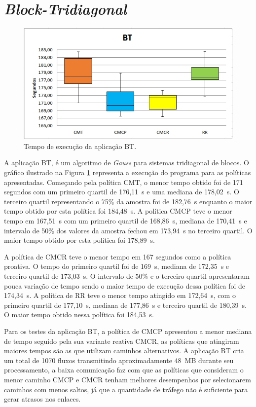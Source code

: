 \section{\textit{Block-Tridiagonal}}
\label{sec:bt}
\begin{figure}[!htb]
	\caption{\label{fig:bt}Tempo de execução da aplicação BT.}
	\begin{center}
	    \includegraphics[scale=0.60]{imagens/bt.jpg}
	\end{center}
\end{figure}
A aplicação BT, é um algoritmo de \textit{Gauss} para sistemas tridiagonal de blocos. 
O gráfico ilustrado na Figura \ref{fig:bt} representa a execução do programa para as políticas apresentadas. Começando pela política CMT, o menor tempo obtido foi de 171 segundos com um primeiro quartil de 176,11~s e uma mediana de 178,02~s. O terceiro quartil representando o 75\% da amostra foi de 182,76~s enquanto o maior tempo obtido por esta política foi 184,48~s. A  política CMCP teve o menor tempo em 167,51~s com um primeiro quartil de 168,86~s, mediana de 170,41~s e intervalo de 50\% dos valores da amostra fechou em 173,94~s no terceiro quartil. O maior tempo obtido por esta política foi 178,89~s.

A política de CMCR teve o menor tempo em 167 segundos como a política proativa. O tempo do primeiro quartil foi de 169~s, mediana de 172,35~s e terceiro quartil de 173,03~s. O intervalo de 50\% e o terceiro quartil apresentaram pouca variação de tempo sendo o maior tempo de execução dessa política foi de 174,34~s. A política de RR teve o menor tempo atingido em 172,64~s, com o primeiro quartil de 177,10~s, mediana de 177,86~s e terceiro quartil de 180,39~s. O maior tempo obtido nessa política foi 184,53~s.

Para os testes da aplicação BT, a política de CMCP apresentou a menor mediana de tempo seguido pela sua variante reativa CMCR, as políticas que atingiram maiores tempos são as que utilizam caminhos alternativos. A aplicação BT cria um total de 1070 fluxos transmitindo aproximadamente 48~MB durante seu processamento, a baixa comunicação faz com que as políticas que consideram o menor caminho CMCP e CMCR tenham melhores desempenhos por selecionarem caminhos com menos saltos, já que a quantidade de tráfego não é suficiente para gerar atrasos nos enlaces.  



